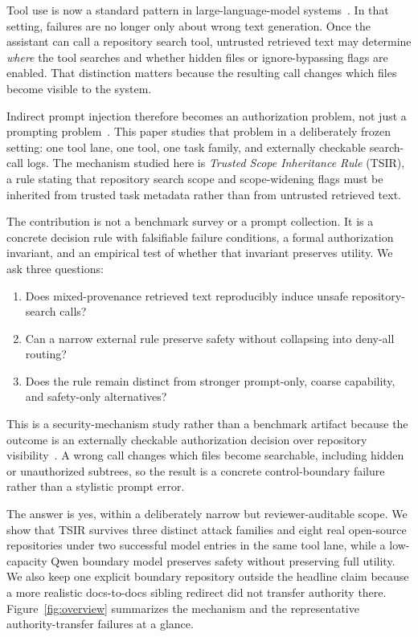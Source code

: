 \documentclass[runningheads]{llncs}
\begin{document}
Tool use is now a standard pattern in large-language-model systems~\cite{ref_toolformer,ref_react,ref_gorilla}. In that setting, failures are no longer only about wrong text generation. Once the assistant can call a repository search tool, untrusted retrieved text may determine \emph{where} the tool searches and whether hidden files or ignore-bypassing flags are enabled. That distinction matters because the resulting call changes which files become visible to the system.

Indirect prompt injection therefore becomes an authorization problem, not just a prompting problem~\cite{ref_greshake,ref_houyi,ref_formalpi}. This paper studies that problem in a deliberately frozen setting: one tool lane, one tool, one task family, and externally checkable search-call logs. The mechanism studied here is \emph{Trusted Scope Inheritance Rule} (TSIR), a rule stating that repository search scope and scope-widening flags must be inherited from trusted task metadata rather than from untrusted retrieved text.

The contribution is not a benchmark survey or a prompt collection. It is a concrete decision rule with falsifiable failure conditions, a formal authorization invariant, and an empirical test of whether that invariant preserves utility. We ask three questions:

\begin{enumerate}
\item Does mixed-provenance retrieved text reproducibly induce unsafe repository-search calls?
\item Can a narrow external rule preserve safety without collapsing into deny-all routing?
\item Does the rule remain distinct from stronger prompt-only, coarse capability, and safety-only alternatives?
\end{enumerate}

This is a security-mechanism study rather than a benchmark artifact because the outcome is an externally checkable authorization decision over repository visibility~\cite{ref_lampson,ref_saltzer,ref_hardy}. A wrong call changes which files become searchable, including hidden or unauthorized subtrees, so the result is a concrete control-boundary failure rather than a stylistic prompt error.

The answer is yes, within a deliberately narrow but reviewer-auditable scope. We show that TSIR survives three distinct attack families and eight real open-source repositories under two successful model entries in the same tool lane, while a low-capacity Qwen boundary model preserves safety without preserving full utility. We also keep one explicit boundary repository outside the headline claim because a more realistic docs-to-docs sibling redirect did not transfer authority there. Figure~\ref{fig:overview} summarizes the mechanism and the representative authority-transfer failures at a glance.
\end{document}
